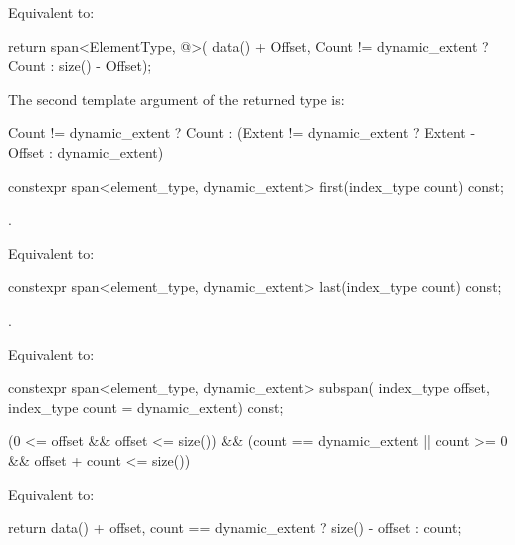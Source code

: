 \begin{codeblock}
\begin{codeblock}
\begin{codeblock}
\begin{itemdescr}
\pnum
\effects
Equivalent to:
\begin{codeblock}
return span<ElementType, @\seebelow@>(
  data() + Offset, Count != dynamic_extent ? Count : size() - Offset);
\end{codeblock}

\pnum
\remarks
The second template argument of the returned  type is:
\begin{codeblock}
Count != dynamic_extent ? Count
                        : (Extent != dynamic_extent ? Extent - Offset
                                                    : dynamic_extent)
\end{codeblock}
\end{itemdescr}

%
\begin{itemdecl}
constexpr span<element_type, dynamic_extent> first(index_type count) const;
\end{itemdecl}
\begin{itemdescr}
\pnum
\requires
{}.

\pnum
\effects
Equivalent to: 
\end{itemdescr}

%
\begin{itemdecl}
constexpr span<element_type, dynamic_extent> last(index_type count) const;
\end{itemdecl}
\begin{itemdescr}
\pnum
\requires
{}.

\pnum
\effects
Equivalent to: 
\end{itemdescr}

%
\begin{itemdecl}
constexpr span<element_type, dynamic_extent> subspan(
  index_type offset, index_type count = dynamic_extent) const;
\end{itemdecl}
\begin{itemdescr}
\pnum
\requires
\begin{codeblock}
(0 <= offset && offset <= size())
&& (count == dynamic_extent || count >= 0 && offset + count <= size())
\end{codeblock}

\pnum
\effects
Equivalent to:
\begin{codeblock}
return {data() + offset, count == dynamic_extent ? size() - offset : count};
\end{codeblock}
\end{itemdescr}


\end{codeblock}
\end{codeblock}
\end{codeblock}
